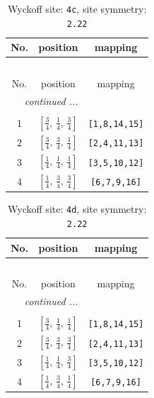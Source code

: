 \documentclass[fleqn,8pt]{jsarticle}
\begin{document}
\renewcommand{\arraystretch}{1.2}
\begin{longtable}{ccc}
\caption{Wyckoff site: {\tt 4c}, site symmetry: {\tt 2.22}}
 \\
 \hline \hline
No. & position & mapping \\ \hline \endfirsthead

\multicolumn{2}{l}{\tablename\ \thetable{}} \\
 \hline \hline
No. & position & mapping \\ \hline \endhead

 \hline \hline
\multicolumn{2}{r}{\footnotesize\it continued ...} \\ \endfoot

 \hline \hline
\multicolumn{2}{r}{} \\ \endlastfoot

1 & $\left[ \frac{3}{4},\, \frac{1}{4},\, \frac{3}{4} \right]$ & {\tt [1,8,14,15]} \\ \hline
2 & $\left[ \frac{3}{4},\, \frac{3}{4},\, \frac{1}{4} \right]$ & {\tt [2,4,11,13]} \\ \hline
3 & $\left[ \frac{1}{4},\, \frac{1}{4},\, \frac{1}{4} \right]$ & {\tt [3,5,10,12]} \\ \hline
4 & $\left[ \frac{1}{4},\, \frac{3}{4},\, \frac{3}{4} \right]$ & {\tt [6,7,9,16]} \\
\end{longtable}
\renewcommand{\arraystretch}{1.2}
\begin{longtable}{ccc}
\caption{Wyckoff site: {\tt 4d}, site symmetry: {\tt 2.22}}
 \\
 \hline \hline
No. & position & mapping \\ \hline \endfirsthead

\multicolumn{2}{l}{\tablename\ \thetable{}} \\
 \hline \hline
No. & position & mapping \\ \hline \endhead

 \hline \hline
\multicolumn{2}{r}{\footnotesize\it continued ...} \\ \endfoot

 \hline \hline
\multicolumn{2}{r}{} \\ \endlastfoot

1 & $\left[ \frac{3}{4},\, \frac{1}{4},\, \frac{1}{4} \right]$ & {\tt [1,8,14,15]} \\ \hline
2 & $\left[ \frac{3}{4},\, \frac{3}{4},\, \frac{3}{4} \right]$ & {\tt [2,4,11,13]} \\ \hline
3 & $\left[ \frac{1}{4},\, \frac{1}{4},\, \frac{3}{4} \right]$ & {\tt [3,5,10,12]} \\ \hline
4 & $\left[ \frac{1}{4},\, \frac{3}{4},\, \frac{1}{4} \right]$ & {\tt [6,7,9,16]} \\
\end{longtable}
\end{document}
